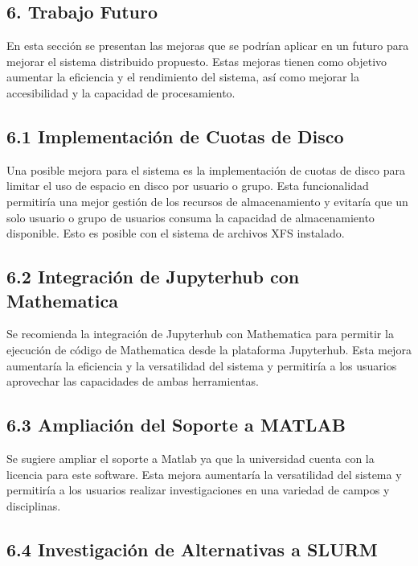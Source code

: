 \begin{spacing}{1.5}
  \begin{tightcenter}
    \section{6. Trabajo Futuro}
    \mylinespacing
  \end{tightcenter}

  En esta sección se presentan las mejoras que se podrían aplicar en un futuro para mejorar el sistema distribuido propuesto. Estas mejoras tienen como objetivo aumentar la eficiencia y el rendimiento del sistema, así como mejorar la accesibilidad y la capacidad de procesamiento.

  \subsection{6.1 Implementación de Cuotas de Disco}

  Una posible mejora para el sistema es la implementación de cuotas de disco para limitar el uso de espacio en disco por usuario o grupo. Esta funcionalidad permitiría una mejor gestión de los recursos de almacenamiento y evitaría que un solo usuario o grupo de usuarios consuma la capacidad de almacenamiento disponible. Esto es posible con el sistema de archivos XFS instalado.

  \subsection{6.2 Integración de Jupyterhub con Mathematica}

Se recomienda la integración de Jupyterhub con Mathematica para permitir la ejecución de código de Mathematica desde la plataforma Jupyterhub. Esta mejora aumentaría la eficiencia y la versatilidad del sistema y permitiría a los usuarios aprovechar las capacidades de ambas herramientas.

\subsection{6.3 Ampliación del Soporte a MATLAB}

Se sugiere ampliar el soporte a Matlab ya que la universidad cuenta con la licencia para este software. Esta mejora aumentaría la versatilidad del sistema y permitiría a los usuarios realizar investigaciones en una variedad de campos y disciplinas.

\subsection{6.4 Investigación de Alternativas a SLURM}


\end{spacing}
